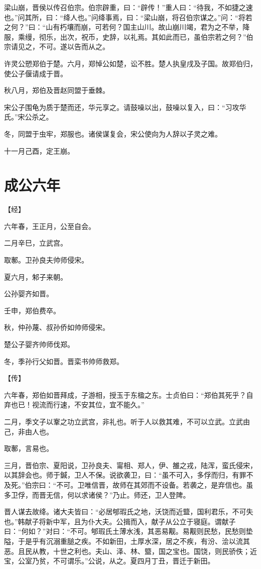 \documentclass[a4paper,12pt,UTF8,twoside]{ctexbook}
\begin{document}
梁山崩，晋侯以传召伯宗。伯宗辟重，曰：“辟传！”重人曰：“待我，不如捷之速也。”问其所，曰：“绛人也。”问绛事焉，曰：“梁山崩，将召伯宗谋之。”问：“将若之何？”曰：“山有朽壤而崩，可若何？国主山川。故山崩川竭，君为之不举，降服，乘缦，彻乐，出次，祝币，史辞，以礼焉。其如此而已，虽伯宗若之何？”伯宗请见之，不可。遂以告而从之。

许灵公愬郑伯于楚。六月，郑悼公如楚，讼不胜。楚人执皇戌及子国。故郑伯归，使公子偃请成于晋。



秋八月，郑伯及晋赵同盟于垂棘。

宋公子围龟为质于楚而还，华元享之。请鼓噪以出，鼓噪以复入，曰：“习攻华氏。”宋公杀之。

冬，同盟于虫牢，郑服也。诸侯谋复会，宋公使向为人辞以子灵之难。

十一月己酉，定王崩。


\chapter{成公六年}


【经】

六年春，王正月，公至自会。

二月辛巳，立武宫。

取鄟。卫孙良夫帅师侵宋。

夏六月，邾子来朝。

公孙婴齐如晋。

壬申，郑伯费卒。

秋，仲孙蔑、叔孙侨如帅师侵宋。

楚公子婴齐帅师伐郑。

冬，季孙行父如晋。晋栾书帅师救郑。

【传】

六年春，郑伯如晋拜成，子游相，授玉于东楹之东。士贞伯曰：“郑伯其死乎？自弃也已！视流而行速，不安其位，宜不能久。”

二月，季文子以鞌之功立武宫，非礼也。听于人以救其难，不可以立武。立武由己，非由人也。

取鄟，言易也。

三月，晋伯宗、夏阳说，卫孙良夫、甯相、郑人，伊、雒之戎，陆浑，蛮氏侵宋，以其辞会也。师于鍼，卫人不保。说欲袭卫，曰：“虽不可入，多俘而归，有罪不及死。”伯宗曰：“不可。卫唯信晋，故师在其郊而不设备。若袭之，是弃信也。虽多卫俘，而晋无信，何以求诸侯？”乃止。师还，卫人登陴。

晋人谋去故绛。诸大夫皆曰：“必居郇瑕氏之地，沃饶而近盬，国利君乐，不可失也。”韩献子将新中军，且为仆大夫。公揖而入，献子从公立于寝庭。谓献子曰：“何如？”对曰：“不可。郇瑕氏土薄水浅，其恶易觏。易觏则民愁，民愁则垫隘，于是乎有沉溺重膇之疾。不如新田，土厚水深，居之不疾，有汾、浍以流其恶。且民从教，十世之利也。夫山、泽、林、盬，国之宝也。国饶，则民骄佚；近宝，公室乃贫，不可谓乐。”公说，从之。夏四月丁丑，晋迁于新田。
\end{document}
